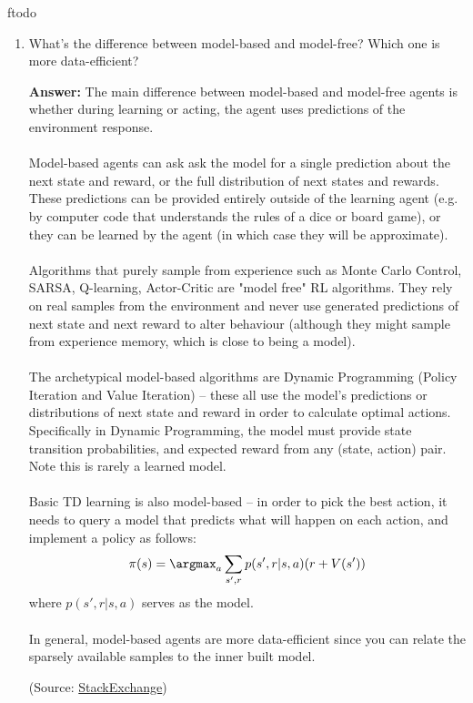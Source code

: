 ƒtodo\documentclass{article}
\newenvironment{QandA}{\begin{enumerate}[label=\arabic*.]}{\end{enumerate}}
\newenvironment{answer}{\par\normalfont \textbf{Answer:}}{}
\newcommand{\g}{\vert}
\begin{document}
\begin{QandA}
\begin{answer}
        (Source: \href{https://www.quora.com/What-are-the-benefits-of-using-off-policy-learning-over-on-policy-learning-in-reinforcement-learning}{Quora})
    \end{answer}

    \item What’s the difference between model-based and model-free? Which one is more data-efficient?
    \begin{answer}
        The main difference between model-based and model-free agents is whether during learning or acting, the agent uses predictions of the environment response. \\\\
        Model-based agents can ask ask the model for a single prediction about the next state and reward, or the full distribution of next states and rewards. These predictions can be provided entirely outside of the learning agent (e.g. by computer code that understands the rules of a dice or board game), or they can be learned by the agent (in which case they will be approximate).\\\\
        Algorithms that purely sample from experience such as Monte Carlo Control, SARSA, Q-learning, Actor-Critic are "model free" RL algorithms. They rely on real samples from the environment and never use generated predictions of next state and next reward to alter behaviour (although they might sample from experience memory, which is close to being a model).\\\\
        The archetypical model-based algorithms are Dynamic Programming (Policy Iteration and Value Iteration) -- these all use the model's predictions or distributions of next state and reward in order to calculate optimal actions. Specifically in Dynamic Programming, the model must provide state transition probabilities, and expected reward from any (state, action) pair. Note this is rarely a learned model. \\\\
        Basic TD learning is also model-based -- in order to pick the best action, it needs to query a model that predicts what will happen on each action, and implement a policy as follows:
        \begin{align*}
            \pi(s) = \argmax_{a} \sum_{s', r} p(s', r \g s, a) (r + V(s'))
        \end{align*}
        where $p(s', r \g s, a)$ serves as the model.\\\\
        In general, model-based agents are more data-efficient since you can relate the sparsely available samples to the inner built model. 
        
        (Source: \href{https://ai.stackexchange.com/questions/4456/whats-the-difference-between-model-free-and-model-based-reinforcement-learning}{StackExchange})
    \end{answer}
\end{QandA}
\end{document}
